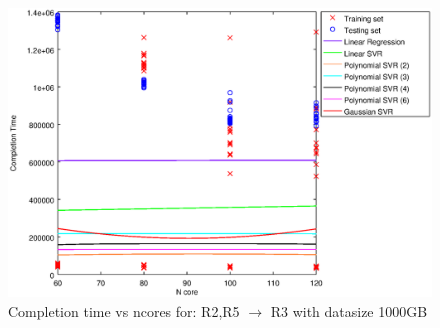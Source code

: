 
\begin {figure}[hbtp]
\centering
\includegraphics[width=\textwidth]{output/R2_R5_VS_R3_1000_ALL_FEATURES/plot_R2_R5_VS_R3_1000.eps}
\caption{Completion time vs ncores for: R2,R5 $\rightarrow$ R3 with datasize 1000GB}
\label{fig:coreonly_linear_R2,R5_R3_1000}
\end {figure}
